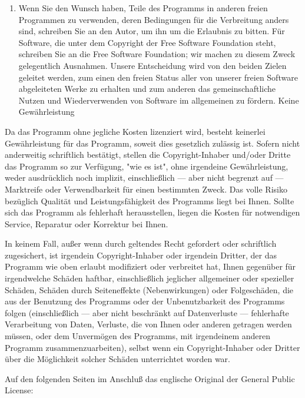 {\begin{enumerate}
\item Wenn Sie den Wunsch haben, Teile des Programms in anderen freien Programmen zu verwenden, deren Bedingungen für die Verbreitung anders sind, schreiben Sie an den Autor, um ihn um die Erlaubnis zu bitten. Für Software, die unter dem Copyright der Free Software Foundation steht, schreiben Sie an die Free Software Foundation; wir machen zu diesem Zweck gelegentlich Ausnahmen. Unsere Entscheidung wird von den beiden Zielen geleitet werden, zum einen den freien Status aller von unserer freien Software abgeleiteten Werke zu erhalten und zum anderen das gemeinschaftliche Nutzen und Wiederverwenden von Software im allgemeinen zu fördern.
Keine Gewährleistung
\end{enumerate}

{\sc
Da das Programm ohne jegliche Kosten lizenziert wird, besteht keinerlei Gewährleistung für das Programm, soweit dies gesetzlich zulässig ist. Sofern nicht anderweitig schriftlich bestätigt, stellen die Copyright-Inhaber und/oder Dritte das Programm so zur Verfügung, "wie es ist", ohne irgendeine Gewährleistung, weder ausdrücklich noch implizit, einschließlich --- aber nicht begrenzt auf --- Marktreife oder Verwendbarkeit für einen bestimmten Zweck. Das volle Risiko bezüglich Qualität und Leistungsfähigkeit des Programms liegt bei Ihnen. Sollte sich das Programm als fehlerhaft herausstellen, liegen die Kosten für notwendigen Service, Reparatur oder Korrektur bei Ihnen.

In keinem Fall, außer wenn durch geltendes Recht gefordert oder schriftlich zugesichert, ist irgendein Copyright-Inhaber oder irgendein Dritter, der das Programm wie oben erlaubt modifiziert oder verbreitet hat, Ihnen gegenüber für irgendwelche Schäden haftbar, einschließlich jeglicher allgemeiner oder spezieller Schäden, Schäden durch Seiteneffekte (Nebenwirkungen) oder Folgeschäden, die aus der Benutzung des Programms oder der Unbenutzbarkeit des Programms folgen (einschließlich --- aber nicht beschränkt auf Datenverluste --- fehlerhafte Verarbeitung von Daten, Verluste, die von Ihnen oder anderen getragen werden müssen, oder dem Unvermögen des Programms, mit irgendeinem anderen Programm zusammenzuarbeiten), selbst wenn ein Copyright-Inhaber oder Dritter über die Möglichkeit solcher Schäden unterrichtet worden war. 
}
}


\vspace{1cm}
Auf den folgenden Seiten im Anschluß das englische Original der General Public License: 
\newpage 


